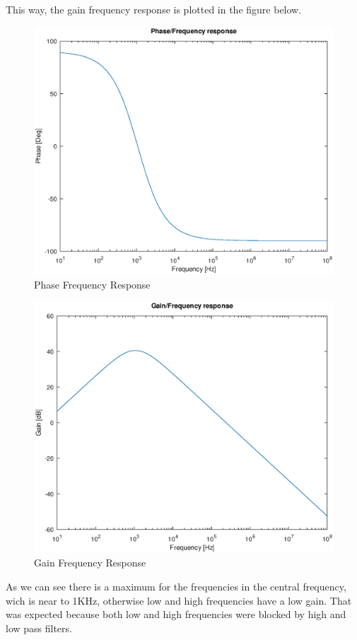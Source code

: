 This way, the gain frequency response is plotted in the figure below.
\begin{figure}[H] \centering
\includegraphics[width=0.6\linewidth]{phase_response.eps}
\caption{Phase Frequency Response}                         %
\label{fig:phasef}
\end{figure}
\begin{figure}[H] \centering
\includegraphics[width=0.6\linewidth]{gain_response.eps}
\caption{Gain Frequency Response}                         %
\label{fig:gainf}
\end{figure}
As we can see there is a maximum for the frequencies in the central frequency, wich is near to 1KHz, otherwise low and high frequencies have a low gain. That was expected because
both low and high frequencies were blocked by high and low pass filters.



